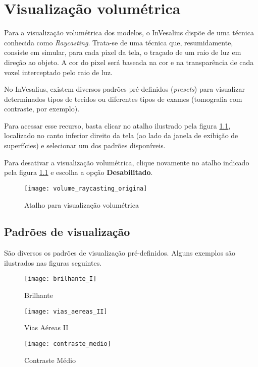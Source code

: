 \chapter{Visualização volumétrica}

Para a visualização volumétrica dos modelos, o InVesalius dispõe de uma técnica
conhecida como \textit{Raycasting}. Trata-se de uma técnica que,
resumidamente, consiste em simular, para cada pixel da tela, o traçado de um raio de luz em
direção ao objeto. A cor do pixel será baseada na cor e na transparência de cada voxel
interceptado pelo raio de luz.

No InVesalius, existem diversos padrões pré-definidos (\textit{presets}) para visualizar
determinados tipos de tecidos ou diferentes tipos de exames (tomografia com contraste, por
exemplo).

Para acessar esse recurso, basta clicar no atalho ilustrado pela figura
\ref{fig:volume_raycasting_origina}, localizado no canto inferior direito da tela (ao lado da
janela de exibição de superfícies) e selecionar um dos padrões disponíveis.

Para desativar a visualização volumétrica, clique novamente no atalho indicado pela figura
\ref{fig:volume_raycasting_origina} e escolha a opção \textbf{Desabilitado}.

\begin{figure}[!htb]
\centering
\texttt{[image: volume\_raycasting\_origina]}
\caption{Atalho para visualização volumétrica}
\label{fig:volume_raycasting_origina}
\end{figure}

\section{Padrões de visualização}

São diversos os padrões de visualização pré-definidos. Alguns exemplos são ilustrados nas
figuras seguintes.

\begin{figure}[!htb]
\centering
\texttt{[image: brilhante\_I]}
\caption{Brilhante}
\label{fig:brilhante_I}
\end{figure}

\begin{figure}[!htb]
\centering 
\texttt{[image: vias\_aereas\_II]}
\caption{Vias Aéreas II}
\label{fig:vias_aereas_II} 
\end{figure}

\begin{figure}[!htb]
\centering
\texttt{[image: contraste\_medio]}
\caption{Contraste Médio}
\label{fig:contraste_medio}
\end{figure}

